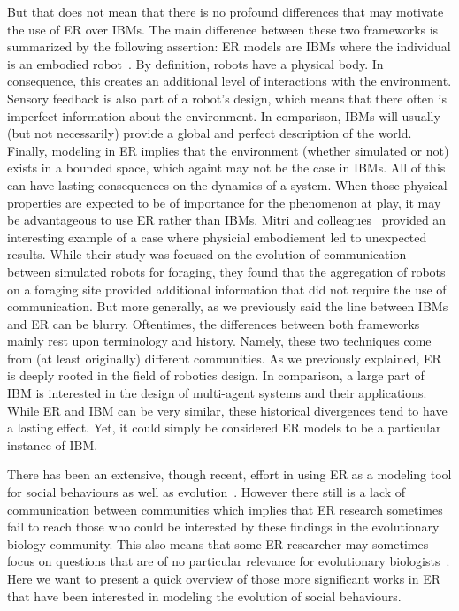         But that does not mean that there is no profound differences that may motivate the use of ER over IBMs. The main difference between these two frameworks is summarized by the following assertion: ER models are IBMs where the individual is an embodied robot~\parencite{Mitri2012}. By definition, robots have a physical body. In consequence, this creates an additional level of interactions with the environment. Sensory feedback is also part of a robot's design, which means that there often is imperfect information about the environment. In comparison, IBMs will usually (but not necessarily) provide a global and perfect description of the world. Finally, modeling in ER implies that the environment (whether simulated or not) exists in a bounded space, which againt may not be the case in IBMs. All of this can have lasting consequences on the dynamics of a system. When those physical properties are expected to be of importance for the phenomenon at play, it may be advantageous to use ER rather than IBMs. Mitri and colleagues~\parencite{Mitri2009} provided an interesting example of a case where physicial embodiement led to unexpected results. While their study was focused on the evolution of communication between simulated robots for foraging, they found that the aggregation of robots on a foraging site provided additional information that did not require the use of communication. But more generally, as we previously said the line between IBMs and ER can be blurry. Oftentimes, the differences between both frameworks mainly rest upon terminology and history. Namely, these two techniques come from (at least originally) different communities. As we previously explained, ER is deeply rooted in the field of robotics design. In comparison, a large part of IBM is interested in the design of multi-agent systems and their applications. While ER and IBM can be very similar, these historical divergences tend to have a lasting effect. Yet, it could simply be considered ER models to be a particular instance of IBM.

        There has been an extensive, though recent, effort in using ER as a modeling tool for social behaviours as well as evolution~\parencite{Mitri2012, Trianni2014b, Eiben2014, Doncieux2015a}. However there still is a lack of communication between communities which implies that ER research sometimes fail to reach those who could be interested by these findings in the evolutionary biology community. This also means that some ER researcher may sometimes focus on questions that are of no particular relevance for evolutionary biologists~\parencite{Trianni2014b, Doncieux2015a}. Here we want to present a quick overview of those more significant works in ER that have been interested in modeling the evolution of social behaviours. 

